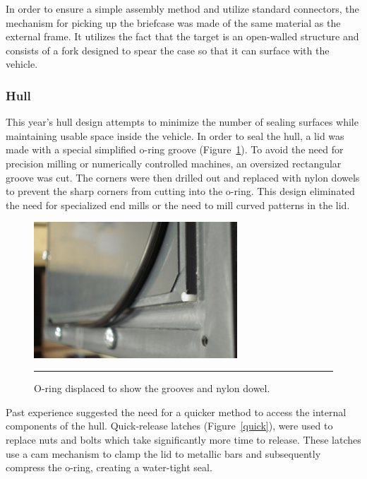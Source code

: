 In order to ensure a simple assembly method and utilize standard
connectors, the mechanism for picking up the briefcase was made of the
same material as the external frame.  It utilizes the fact that the
target is an open-walled structure and consists of a fork designed to
spear the case so that it can surface with the vehicle.

\subsubsection{Hull}
This year's hull design attempts to minimize the number of sealing
surfaces while maintaining usable space inside the vehicle.  In order
to seal the hull, a lid was made with a special simplified o-ring
groove (Figure~\ref{oring}). To avoid the need for precision milling or numerically
controlled machines, an oversized rectangular groove was cut.  The
corners were then drilled out and replaced with nylon dowels to
prevent the sharp corners from cutting into the o-ring.  This design
eliminated the need for specialized end mills or the need to mill
curved patterns in the lid. 

\begin{figure}
\begin{center}
 \includegraphics[width=3in]{fig/dsc06460.jpg} 
\vspace{.05in}
\hrule
\caption{O-ring displaced to show the grooves and nylon dowel.}\label{oring}
\end{center}
\end{figure}

Past experience suggested the need for a quicker method to access the
internal components of the hull.  Quick-release latches 
(Figure~\ref{quick}), were
used to replace nuts and bolts which take significantly more time to
release.  These latches use a cam mechanism to clamp the lid to
metallic bars and subsequently compress the o-ring, creating a water-tight seal.

